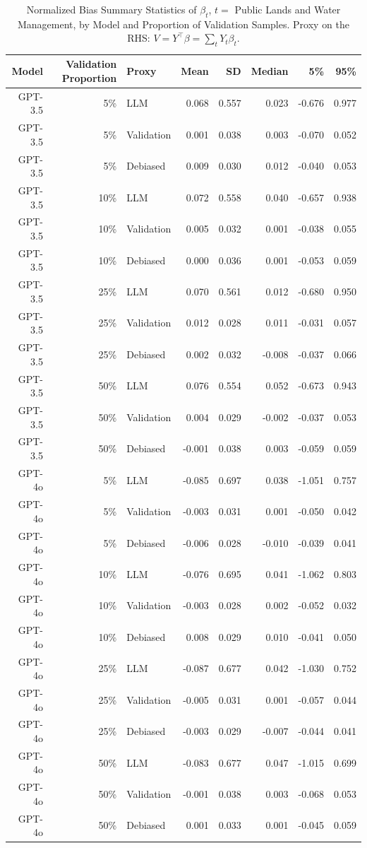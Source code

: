 \begin{table}

\caption{Normalized Bias Summary Statistics of $\beta_{t}$, $t=$ Public Lands and Water Management, by Model and Proportion of Validation Samples. Proxy on the RHS: $V = Y^\top \beta = \sum_{t} Y_t \beta_t$.}
\centering
\begin{tabular}[t]{rrlrrrrr}
\toprule
Model & Validation Proportion & Proxy & Mean & SD & Median & 5\% & 95\%\\
\midrule
GPT-3.5 & 5\% & LLM & 0.068 & 0.557 & 0.023 & -0.676 & 0.977\\
GPT-3.5 & 5\% & Validation & 0.001 & 0.038 & 0.003 & -0.070 & 0.052\\
GPT-3.5 & 5\% & Debiased & 0.009 & 0.030 & 0.012 & -0.040 & 0.053\\
GPT-3.5 & 10\% & LLM & 0.072 & 0.558 & 0.040 & -0.657 & 0.938\\
GPT-3.5 & 10\% & Validation & 0.005 & 0.032 & 0.001 & -0.038 & 0.055\\
GPT-3.5 & 10\% & Debiased & 0.000 & 0.036 & 0.001 & -0.053 & 0.059\\
GPT-3.5 & 25\% & LLM & 0.070 & 0.561 & 0.012 & -0.680 & 0.950\\
GPT-3.5 & 25\% & Validation & 0.012 & 0.028 & 0.011 & -0.031 & 0.057\\
GPT-3.5 & 25\% & Debiased & 0.002 & 0.032 & -0.008 & -0.037 & 0.066\\
GPT-3.5 & 50\% & LLM & 0.076 & 0.554 & 0.052 & -0.673 & 0.943\\
GPT-3.5 & 50\% & Validation & 0.004 & 0.029 & -0.002 & -0.037 & 0.053\\
GPT-3.5 & 50\% & Debiased & -0.001 & 0.038 & 0.003 & -0.059 & 0.059\\
GPT-4o & 5\% & LLM & -0.085 & 0.697 & 0.038 & -1.051 & 0.757\\
GPT-4o & 5\% & Validation & -0.003 & 0.031 & 0.001 & -0.050 & 0.042\\
GPT-4o & 5\% & Debiased & -0.006 & 0.028 & -0.010 & -0.039 & 0.041\\
GPT-4o & 10\% & LLM & -0.076 & 0.695 & 0.041 & -1.062 & 0.803\\
GPT-4o & 10\% & Validation & -0.003 & 0.028 & 0.002 & -0.052 & 0.032\\
GPT-4o & 10\% & Debiased & 0.008 & 0.029 & 0.010 & -0.041 & 0.050\\
GPT-4o & 25\% & LLM & -0.087 & 0.677 & 0.042 & -1.030 & 0.752\\
GPT-4o & 25\% & Validation & -0.005 & 0.031 & 0.001 & -0.057 & 0.044\\
GPT-4o & 25\% & Debiased & -0.003 & 0.029 & -0.007 & -0.044 & 0.041\\
GPT-4o & 50\% & LLM & -0.083 & 0.677 & 0.047 & -1.015 & 0.699\\
GPT-4o & 50\% & Validation & -0.001 & 0.038 & 0.003 & -0.068 & 0.053\\
GPT-4o & 50\% & Debiased & 0.001 & 0.033 & 0.001 & -0.045 & 0.059\\
\bottomrule
\end{tabular}
\end{table}

